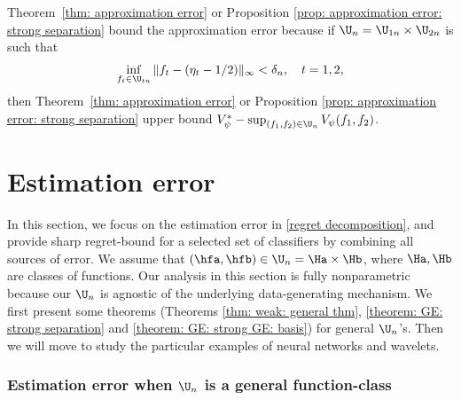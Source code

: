 \documentclass[preprint] {imsart}
\begin{document}
Theorem~\ref{thm: approximation error} or Proposition \ref{prop: approximation error: strong separation} bound the approximation error because if $\U_n=\U_{1n}\times\U_{2n}$ is  such that 
\begin{align}
\label{intext: approx}
  \inf_{f_t\in\U_{tn}}\|f_t-(\eta_t-1/2)\|_\infty<\delta_n, \quad t=1,2,
\end{align}
then Theorem~\ref{thm: approximation error} or Proposition \ref{prop: approximation error: strong separation}  upper bound 
 $V_\psi^*-\sup_{(f_1,f_2)\in\U_n}V_\psi(f_1,f_2)$. 








 
 \section{Estimation error}
\label{sec: generalization}

In this section, we focus on  the estimation error in \eqref{regret decomposition}, and provide sharp regret-bound for a selected set of classifiers by combining all sources of error. We assume that $(\hfa,\hfb)\in \U_n=\Ha\times \Hb$, where $\Ha,\Hb$ are  classes of functions. 
Our analysis in this section is  fully nonparametric because our $\U_n$ is agnostic of the underlying data-generating mechanism.
We first present some theorems (Theorems \ref{thm: weak: general thm}, \ref{theorem: GE: strong separation} and  \ref{theorem: GE: strong GE: basis}) for general $\U_n$'s. 
Then we will move  to study the particular examples of neural networks and wavelets.  



\subsubsection{Estimation error  when $\U_n$ is a general function-class}
\end{document}
